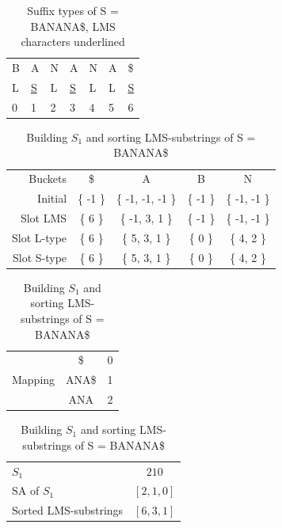 \begin{table}
    \begin{center}
        \begin{tabular}[c]{l l l l l l l}
            B & A & N & A & N & A & \$ \\ 
            L & \underline{S} & L & \underline{S} & L & L & \underline{S} \\ 
            0 & 1 & 2 & 3 & 4 & 5 & 6 \\ 
        \end{tabular}
    \end{center}
    \caption{Suffix types of S = BANANA\$, LMS characters underlined}
    \label{tab:suffixtypesbanana}
\end{table}


\begin{table}
    \begin{center}
        \begin{tabular}[c]{r|cccc}
            Buckets & \$ & A & B & N\\
            Initial & \{ -1 \} & \{ -1, -1, -1 \} & \{ -1 \} & \{ -1, -1 \}\\
            Slot LMS & \{  6 \} & \{ -1,  3,  1 \} & \{ -1 \} & \{ -1, -1 \}\\
            Slot L-type & \{  6 \} & \{  5,  3,  1 \} & \{  0 \} & \{  4,  2 \}\\
            Slot S-type & \{  6 \} & \{  5,  3,  1 \} & \{  0 \} & \{  4,  2 \}\\
        \end{tabular}

        \vspace{0.5cm}
        \begin{tabular}[c]{r|c|c}
                    & \$ & 0 \\
            Mapping & ANA\$ & 1 \\
                    & ANA & 2 \\
        \end{tabular}

        \vspace{0.5cm}

        \begin{tabular}[c]{l|c}
                    $S_1$ & $210$ \\
                    SA of $S_1$ & $[2, 1, 0]$ \\
                    Sorted LMS-substrings & $[6, 3, 1]$ \\
        \end{tabular}

    \end{center}
    \caption{Building $S_1$ and sorting LMS-substrings of S = BANANA\$}
    \label{tab:bucketinglms}
\end{table}


